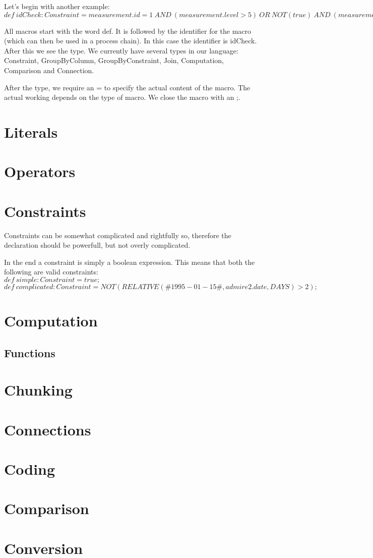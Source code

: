 \documentclass[a4paper]{article}
\begin{document}
Let's begin with another example: \\

$def\ idCheck : Constraint = measurement.id = 1\ AND\ (measurement.level > 5)\ OR\ NOT(true)\ AND\ (measurement.level > measurement.value);$

All macros start with the word def. It is followed by the identifier for the macro (which can then be used in a process chain). In this case the identifier is idCheck. After this we see the type. We currently have several types in our language: Constraint, GroupByColumn, GroupByConstraint, Join, Computation, Comparison and Connection.

After the type, we require an = to specify the actual content of the macro. The actual working depends on the type of macro. We close the macro with an ;.

\section{Literals}


\section{Operators}


\section{Constraints}
Constraints can be somewhat complicated and rightfully so, therefore the declaration should be powerfull, but not overly complicated.

In the end a constraint is simply a boolean expression. This means that both the following are valid constraints: \\
$def\ simple : Constraint = true;$ \\
$def\ complicated : Constraint = NOT(RELATIVE(\#1995-01-15\#, admire2.date, DAYS) > 2);$

\section{Computation}

\subsection{Functions}


\section{Chunking}

\section{Connections}

\section{Coding}

\section{Comparison}

\section{Conversion}

\end{document}
